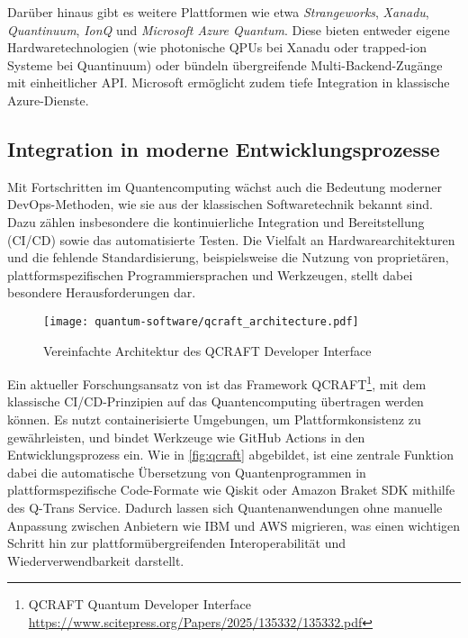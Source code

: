 Darüber hinaus gibt es weitere Plattformen wie etwa \textit{Strangeworks}, \textit{Xanadu}, \textit{Quantinuum}, \textit{IonQ} und \textit{Microsoft Azure Quantum}. Diese bieten entweder eigene Hardwaretechnologien (wie photonische QPUs bei Xanadu oder trapped-ion Systeme bei Quantinuum) oder bündeln übergreifende Multi-Backend-Zugänge mit einheitlicher API. Microsoft ermöglicht zudem tiefe Integration in klassische Azure-Dienste.

\subsection{Integration in moderne Entwicklungsprozesse}
\label{sec:integration-devops}

Mit Fortschritten im Quantencomputing wächst auch die Bedeutung moderner DevOps-Methoden, wie sie aus der klassischen Softwaretechnik bekannt sind. Dazu zählen insbesondere die kontinuierliche Integration und Bereitstellung (CI/CD) sowie das automatisierte Testen. Die Vielfalt an Hardwarearchitekturen und die fehlende Standardisierung, beispielsweise die Nutzung von proprietären, plattformspezifischen Programmiersprachen und Werkzeugen, stellt dabei besondere Herausforderungen dar.

\begin{figure}[ht!]
  \centering
  \texttt{[image: quantum-software/qcraft\_architecture.pdf]}
  \caption{Vereinfachte Architektur des QCRAFT Developer Interface \autocite{romero-alvarez_qcraft_2025}}
  \label{fig:qcraft}
\end{figure}

Ein aktueller Forschungsansatz von \citeauthor{romero-alvarez_qcraft_2025} ist das Framework QCRAFT\footnote{QCRAFT Quantum Developer Interface \url{https://www.scitepress.org/Papers/2025/135332/135332.pdf}}, mit dem klassische CI/CD-Prinzipien auf das Quantencomputing übertragen werden können. Es nutzt containerisierte Umgebungen, um Plattformkonsistenz zu gewährleisten, und bindet Werkzeuge wie GitHub Actions in den Entwicklungsprozess ein. Wie in \autoref{fig:qcraft} abgebildet, ist eine zentrale Funktion dabei die automatische Übersetzung von Quantenprogrammen in plattformspezifische Code-Formate wie Qiskit oder Amazon Braket SDK mithilfe des Q-Trans Service. Dadurch lassen sich Quantenanwendungen ohne manuelle Anpassung zwischen Anbietern wie IBM und AWS migrieren, was einen wichtigen Schritt hin zur plattformübergreifenden Interoperabilität und Wiederverwendbarkeit darstellt.


